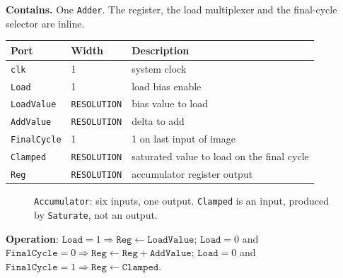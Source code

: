 \documentclass[11pt,a4paper]{article}
\begin{document}
\textbf{Contains.} One \texttt{Adder}. The register, the load multiplexer and the
final-cycle selector are inline.

\begin{center}
\small
\begin{tabularx}{\linewidth}{@{}llL@{}}
\toprule
\textbf{Port} & \textbf{Width} & \textbf{Description} \\
\midrule
\texttt{clk}        & 1  & system clock \\
\texttt{Load}       & 1  & load bias enable \\
\texttt{LoadValue}  & \texttt{RESOLUTION} & bias value to load \\
\texttt{AddValue}   & \texttt{RESOLUTION} & delta to add \\
\texttt{FinalCycle} & 1  & 1 on last input of image \\
\texttt{Clamped}    & \texttt{RESOLUTION} & saturated value to load on the final cycle \\
\texttt{Reg}        & \texttt{RESOLUTION} & accumulator register output \\
\bottomrule
\end{tabularx}
\end{center}

\begin{figure}[H]
\centering
{}
\caption{\texttt{Accumulator}: six inputs, one output. \texttt{Clamped} is an
  input, produced by \texttt{Saturate}, not an output.}
\label{fig:acc}
\end{figure}

\textbf{Operation}:
$\texttt{Load} = 1 \Rightarrow \texttt{Reg} \leftarrow \texttt{LoadValue}$;
$\texttt{Load} = 0$ and $\texttt{FinalCycle} = 0 \Rightarrow
\texttt{Reg} \leftarrow \texttt{Reg} + \texttt{AddValue}$;
$\texttt{Load} = 0$ and $\texttt{FinalCycle} = 1 \Rightarrow
\texttt{Reg} \leftarrow \texttt{Clamped}$.
\end{document}
